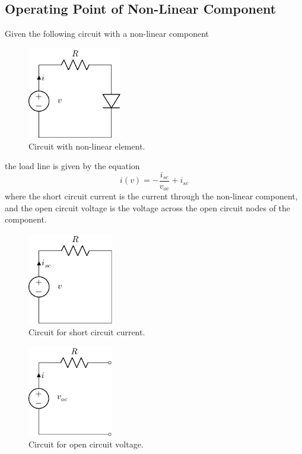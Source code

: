 \documentclass{article}
\begin{document}
\subsection{Operating Point of Non-Linear Component}
Given the following circuit with a non-linear component
\begin{figure}[H]
    \centering
    \includegraphics[height = 4cm, keepaspectratio = true]{figures/non_linear_component.pdf}
    \caption{Circuit with non-linear element.}
\end{figure}
the load line is given by the equation
\begin{equation*}
    i(v) = -\frac{i_{sc}}{v_{oc}} + i_{sc}
\end{equation*}
where the short circuit current is the current through the non-linear component, and the open circuit voltage is the voltage across the
open circuit nodes of the component.
\begin{figure}[H]
    \centering
    \includegraphics[height = 4cm, keepaspectratio = true]{figures/non_linear_short_circuit_current.pdf}
    \caption{Circuit for short circuit current.}
\end{figure}
\begin{figure}[H]
    \centering
    \includegraphics[height = 4cm, keepaspectratio = true]{figures/non_linear_open_circuit_voltage.pdf}
    \caption{Circuit for open circuit voltage.}
\end{figure}
\newpage
\end{document}
